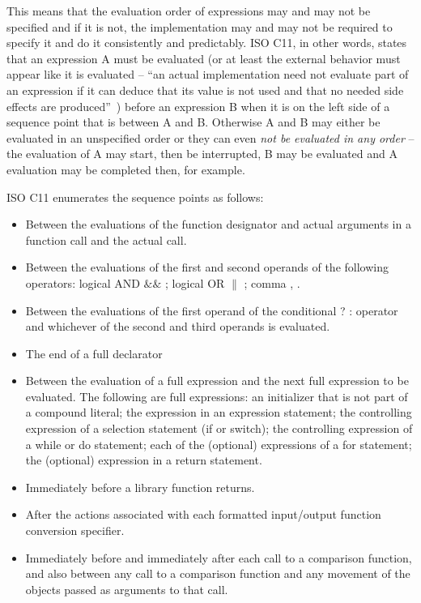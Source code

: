 This means that the evaluation order of expressions may and may not be specified and if it is not, the implementation may and may not be required to specify it and do it consistently and predictably. ISO C11, in other words, states that an expression A must be evaluated (or at least the external behavior must appear like it is evaluated -- ``an actual implementation need not evaluate part of an expression if it can deduce that its value is not used and that no needed side effects are produced''~\cite{WG14N1570}) before an expression B when it is on the left side of a sequence point that is between A and B. Otherwise A and B may either be evaluated in an unspecified order or they can even \emph{not be evaluated in any order} -- the evaluation of A may start, then be interrupted, B may be evaluated and A evaluation may be completed then, for example.

ISO C11 enumerates the sequence points as follows:~\cite{WG14N1570}
\begin{itemize}
    \item Between the evaluations of the function designator and actual arguments in a function call and the actual call.
    \item Between the evaluations of the first and second operands of the following operators: logical AND $\&\&$ ; logical OR $\|$ ; comma , .
    \item Between the evaluations of the first operand of the conditional ? : operator and whichever of the second and third operands is evaluated.
    \item The end of a full declarator
    \item Between the evaluation of a full expression and the next full expression to be evaluated. The following are full expressions: an initializer that is not part of a compound literal; the expression in an expression statement; the
controlling expression of a selection statement (if or switch); the controlling expression of a while or do statement; each of the (optional) expressions of a for statement; the (optional) expression in a return statement.
    \item Immediately before a library function returns.
    \item After the actions associated with each formatted input/output function conversion specifier.
    \item Immediately before and immediately after each call to a comparison function, and also between any call to a comparison function and any movement of the objects passed as arguments to that call.
\end{itemize}

